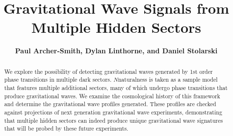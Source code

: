 \documentclass[nofootinbib,twocolumn,preprintnumbers]{revtex4-1}
\begin{document}
\def\lsim{\mathrel{\rlap{\lower4pt\hbox{\hskip1pt$\sim$}}
  \raise1pt\hbox{$<$}}}
\def\gsim{\mathrel{\rlap{\lower4pt\hbox{\hskip1pt$\sim$}}
  \raise1pt\hbox{$>$}}}
\newcommand{\vev}[1]{ \left\langle {#1} \right\rangle }
\newcommand{\bra}[1]{ \langle {#1} | }
\newcommand{\ket}[1]{ | {#1} \rangle }
\newcommand{\ev}{ {\rm eV} }
\newcommand{\kev}{{\rm keV}}
\newcommand{\mev}{{\rm MeV}}
\newcommand{\gev}{{\mathrm GeV}}
\newcommand{\tev}{{\rm TeV}}
\newcommand{\mpl}{$M_{Pl}$}
\newcommand{\mw}{$M_{W}$}
\newcommand{\Ft}{F_{T}}
\newcommand{\Zparity}{\mathbb{Z}_2}
\newcommand{\BLambda}{\boldsymbol{\lambda}}
\newcommand{\met}{\;\not\!\!\!{E}_T}
\newcommand{\beq}{\begin{equation}}
\newcommand{\eeq}{\end{equation}}
\newcommand{\bea}{\begin{eqnarray}}
\newcommand{\eea}{\end{eqnarray}}
\newcommand{\nn}{\nonumber}
\newcommand{\hc}{\mathrm{h.c.}}
\newcommand{\eps}{\epsilon}
\newcommand{\bwt}{\begin{widetext}}
\newcommand{\ewt}{\end{widetext}}
\newcommand{\draftnote}[1]{{\bf\color{blue} #1}}
\newcommand{\cO}{{\cal O}}
\newcommand{\cL}{{\cal L}}
\newcommand{\cM}{{\cal M}}
\newcommand{\fref}[1]{Fig.~\ref{fig:#1}} 
\newcommand{\eref}[1]{Eq.~\eqref{eq:#1}} 
\newcommand{\aref}[1]{Appendix~\ref{app:#1}}
\newcommand{\sref}[1]{Section~\ref{sec:#1}}
\newcommand{\tref}[1]{Table~\ref{tab:#1}}
\title{\LARGE{{\bf{Gravitational Wave Signals from Multiple Hidden Sectors} \\
}}}
\author{{\bf {Paul Archer-Smith, Dylan Linthorne, and Daniel Stolarski}}}
\begin{abstract}
We explore the possibility of detecting gravitational waves generated by 1st order phase transitions in multiple dark sectors. $N$naturalness is taken as a sample model that features multiple additional sectors, many of which undergo phase transitions that produce gravitational waves. We examine the cosmological history of this framework and determine the gravitational wave profiles generated. These profiles are checked against projections of next generation gravitational wave experiments, demonstrating that multiple hidden sectors can indeed produce unique gravitational wave signatures that will be probed by these future experiments. 
\end{abstract}
\maketitle
\end{document}
